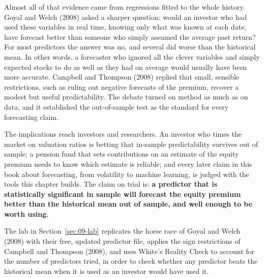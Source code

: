 Almost all of that evidence came from regressions fitted to the whole history. Goyal and Welch (2008) asked a sharper question: would an investor who had used these variables in real time, knowing only what was known at each date, have forecast better than someone who simply assumed the average past return? For most predictors the answer was no, and several did worse than the historical mean. In other words, a forecaster who ignored all the clever variables and simply expected stocks to do as well as they had on average would usually have been more accurate. Campbell and Thompson (2008) replied that small, sensible restrictions, such as ruling out negative forecasts of the premium, recover a modest but useful predictability. The debate turned on method as much as on data, and it established the out-of-sample test as the standard for every forecasting claim.

The implications reach investors and researchers. An investor who times the market on valuation ratios is betting that in-sample predictability survives out of sample; a pension fund that sets contributions on an estimate of the equity premium needs to know which estimate is reliable; and every later claim in this book about forecasting, from volatility to machine learning, is judged with the tools this chapter builds. The claim on trial is: \textbf{a predictor that is statistically significant in sample will forecast the equity premium better than the historical mean out of sample, and well enough to be worth using.}

The lab in Section~\ref{sec:09-lab} replicates the horse race of Goyal and Welch (2008) with their free, updated predictor file, applies the sign restrictions of Campbell and Thompson (2008), and uses White's Reality Check to account for the number of predictors tried, in order to check whether any predictor beats the historical mean when it is used as an investor would have used it.

